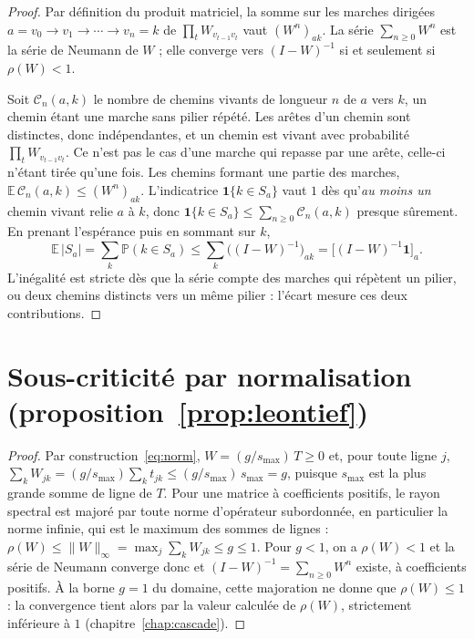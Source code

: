 \begin{proof}
Par définition du produit matriciel, la somme sur les marches dirigées
$a=v_0\to v_1\to\cdots\to v_n=k$ de $\prod_t W_{v_{t-1}v_t}$ vaut $(W^n)_{ak}$. La série
$\sum_{n\ge0}W^n$ est la série de Neumann de $W$ ; elle converge vers $(I-W)^{-1}$ si et seulement si
$\rho(W)<1$.

Soit $\mathcal C_n(a,k)$ le nombre de chemins vivants de longueur $n$ de $a$ vers $k$, un chemin
étant une marche sans pilier répété. Les arêtes d'un chemin sont distinctes, donc indépendantes, et
un chemin est vivant avec probabilité $\prod_t W_{v_{t-1}v_t}$. Ce n'est pas le cas d'une marche qui
repasse par une arête, celle-ci n'étant tirée qu'une fois. Les chemins formant une partie des
marches, $\mathbb E\,\mathcal C_n(a,k)\le (W^n)_{ak}$. L'indicatrice $\mathbf 1\{k\in S_a\}$ vaut $1$
dès qu'\emph{au moins un} chemin vivant relie $a$ à $k$, donc
$\mathbf 1\{k\in S_a\}\le \sum_{n\ge0}\mathcal C_n(a,k)$ presque sûrement. En prenant l'espérance
puis en sommant sur $k$,
\[
  \mathbb E\,|S_a|=\sum_k \mathbb P(k\in S_a)\le \sum_k\bigl((I-W)^{-1}\bigr)_{ak}
  =\bigl[(I-W)^{-1}\mathbf 1\bigr]_a .
\]
L'inégalité est stricte dès que la série compte des marches qui répètent un pilier, ou deux
chemins distincts vers un même pilier : l'écart mesure ces deux contributions.
\end{proof}

\section*{Sous-criticité par normalisation (proposition~\ref{prop:leontief})}

\begin{proof}
Par construction~\eqref{eq:norm}, $W=(g/s_{\max})\,T\ge 0$ et, pour toute ligne
$j$, $\sum_k W_{jk}=(g/s_{\max})\sum_k t_{jk}\le (g/s_{\max})\,s_{\max}=g$, puisque
$s_{\max}$ est la plus grande somme de ligne de $T$. Pour une matrice à
coefficients positifs, le rayon spectral est majoré par toute norme d'opérateur subordonnée,
en particulier la norme infinie, qui est le maximum des sommes de lignes :
$\rho(W)\le\lVert W\rVert_\infty=\max_j\sum_k W_{jk}\le g\le 1$. Pour $g<1$, on a $\rho(W)<1$ et la
série de Neumann converge donc
et $(I-W)^{-1}=\sum_{n\ge0}W^n$ existe, à coefficients positifs. À la borne $g=1$ du domaine, cette
majoration ne donne que $\rho(W)\le 1$ : la convergence tient alors par la valeur calculée de
$\rho(W)$, strictement inférieure à $1$ (chapitre~\ref{chap:cascade}).
\end{proof}


